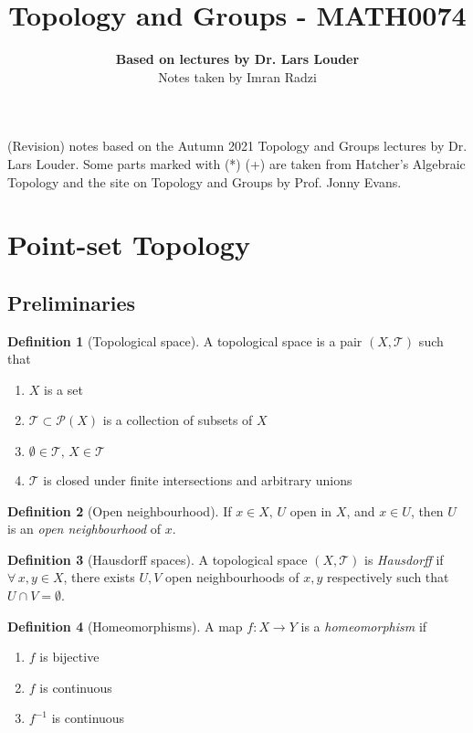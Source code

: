 \documentclass[a4paper,14pt]{extarticle}
\theoremstyle{definition}
\newtheorem*{definition}{Definition}
\begin{document}
\title{\textbf{Topology and Groups - MATH0074}}
\author{\textbf{Based on lectures by Dr. Lars Louder}\\ Notes taken by Imran Radzi}
\date{}
\maketitle

(Revision) notes based on the Autumn 2021 Topology and Groups lectures by Dr. Lars Louder.
Some parts marked with (*) (+) are taken from Hatcher's Algebraic Topology and 
the site on Topology and Groups by Prof. Jonny Evans.
\begingroup
\let\cleardoublepage\clearpage
\tableofcontents
\endgroup
\newpage
{}

\section{Point-set Topology}

\subsection{Preliminaries}
\begin{definition}[Topological space]
  A topological space is a pair $(X,\mathcal{T})$ such that
  \begin{enumerate}
    \item $X$ is a set 
    \item $\mathcal{T}\subset \mathcal{P}(X)$ is a collection of subsets of $X$
    \item $\emptyset\in\mathcal{T}, \,X\in\mathcal{T}$
    \item $\mathcal{T}$ is closed under finite intersections and arbitrary unions
  \end{enumerate}
\end{definition}

\begin{definition}[Open neighbourhood]
  If $x\in X, \,U$ open in $X$, and $x\in U$, then $U$ is an \emph{open neighbourhood} of $x$.
\end{definition}

\begin{definition}[Hausdorff spaces]
  A topological space $(X,\mathcal{T})$ is \emph{Hausdorff} if $\forall \,x,y\in X$, there 
  exists $U,V$ open neighbourhoods of $x,y$ respectively such that $U\cap V=\emptyset$.
\end{definition}

\begin{definition}[Homeomorphisms]
  A map $f:X\rightarrow Y$ is a \emph{homeomorphism} if 
  \begin{enumerate}
    \item $f$ is bijective
    \item $f$ is continuous
    \item $f^{-1}$ is continuous
  \end{enumerate}
\end{definition}
\end{document}
